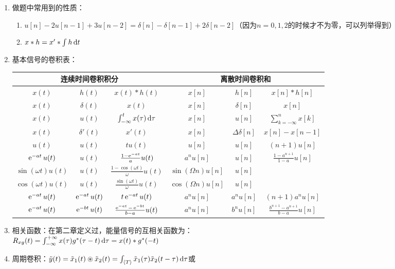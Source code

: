 \documentclass{article}
\renewcommand\var[1]{\Delta{#1}}
\begin{document}
\begin{enumerate}[label=(\arabic*)]
\begin{remark}
				\end{remark}
	\item 做题中常用到的性质：
				\begin{enumerate}[label=(\roman*)]
					\item $u[n]-2u[n-1]+3u[n-2]=\delta[n]-\delta[n-1]+2\delta[n-2]$（因为$n=0,1,2$的时候才不为零，可以列举得到）
					\item $x*h=x'*\int h\mathop{}\!\mathrm{d} t$
				\end{enumerate}
	\item 基本信号的卷积表：
				\begin{table}[H]
					\begin{tabular}{ccc|ccc}
						\toprule
						\multicolumn{3}{c}{连续时间卷积积分} & \multicolumn{3}{c}{离散时间卷积和} \\
						\midrule
						$x(t)$ & $h(t)$ & $x(t)*h(t)$ & $x[n]$ & $h[n]$ & $x[n]*h[n]$ \\
						$x(t)$ & $\delta(t)$ & $x(t)$ & $x[n]$ & $\delta[n]$ & $x[n]$ \\
						$x(t)$ & $u(t)$ & $\int_{-\infty}^{t}x(\tau)\mathop{}\!\mathrm{d}\tau$ & $x[n]$ & $u[n]$ & $\sum_{k=-\infty}^{n}x[k]$ \\
						$x(t)$ & $\delta'(t)$ & $x'(t)$ & $x[n]$ & $\var{\delta[n]}$ & $x[n]-x[n-1]$ \\
						$u(t)$ & $u(t)$ & $tu(t)$ & $u[n]$ & $u[n]$ & $(n+1)u[n]$ \\
						$\operatorname{e}^{-at}u(t)$ & $u(t)$ & $\frac{1-\operatorname{e}^{-at}}{a}u(t)$ & $a^{n}u[n]$ & $u[n]$ & $\frac{1-a^{n+1}}{1-a}u[n]$ \\
						$\sin(\omega t)u(t)$ & $u(t)$ & $\frac{1-\cos (\omega t)}{\omega}u(t)$ & $\sin(\Omega n)u[n]$ & $u[n]$ & ~ \\
						$\cos(\omega t)u(t)$ & $u(t)$ & $\frac{\sin(\omega t)}{\omega}u(t)$ & $\cos(\Omega n)u[n]$ & $u[n]$ & ~ \\
						$\operatorname{e}^{-at}u(t)$ & $\operatorname{e}^{-at}u(t)$ & $t\operatorname{e}^{-at}u(t)$ & $a^{n}u[n]$ & $a^{n}u[n]$ & $(n+1)a^{n}u[n]$ \\
						$\operatorname{e}^{-at}u(t)$ & $\operatorname{e}^{-bt}u(t)$ & $\frac{\operatorname{e}^{-at}-\operatorname{e}^{-bt}}{b-a}u(t)$ & $a^{n}u[n]$ & $b^{n}u[n]$ & $\frac{b^{n+1}-a^{n+1}}{b-a}u[n]$ \\
						\bottomrule
					\end{tabular}
				\end{table}
	\item 相关函数：在第二章定义过，能量信号的互相关函数为：\\
				$R_{xg}(t) = \int_{-\infty}^{+\infty}x(\tau)g^*(\tau-t)\mathop{}\!\mathrm{d}\tau = x(t)*g^*(-t)$
	\item 周期卷积：$\tilde{y}(t)=\tilde{x}_1(t)\circledast\tilde{x}_2(t)=\int_{\langle T\rangle}\tilde{x}_1(\tau)\tilde{x}_2(t-\tau)\mathop{}\!\mathrm{d}\tau$或\\

\end{enumerate}
\end{document}
